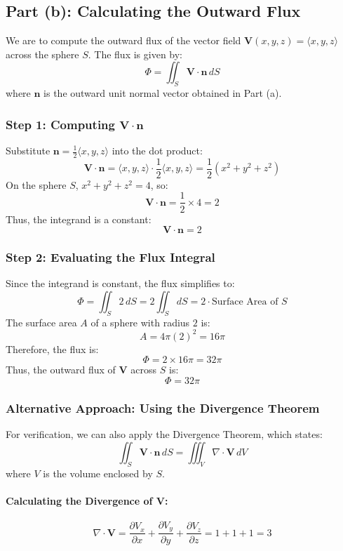 \documentclass[11pt]{article}
\begin{document}
\newpage

\subsection{Part (b): Calculating the Outward Flux}

We are to compute the outward flux of the vector field \( \mathbf{V}(x,y,z) = \langle x, y, z \rangle \) across the sphere \( S \). The flux is given by:
\[
\Phi = \iint_{S} \mathbf{V} \cdot \mathbf{n} \, dS
\]
where \( \mathbf{n} \) is the outward unit normal vector obtained in Part (a).

\subsubsection*{Step 1: Computing \( \mathbf{V} \cdot \mathbf{n} \)}

Substitute \( \mathbf{n} = \frac{1}{2} \langle x, y, z \rangle \) into the dot product:
\[
\mathbf{V} \cdot \mathbf{n} = \langle x, y, z \rangle \cdot \frac{1}{2} \langle x, y, z \rangle = \frac{1}{2}(x^2 + y^2 + z^2)
\]
On the sphere \( S \), \( x^2 + y^2 + z^2 = 4 \), so:
\[
\mathbf{V} \cdot \mathbf{n} = \frac{1}{2} \times 4 = 2
\]
Thus, the integrand is a constant:
\[
\mathbf{V} \cdot \mathbf{n} = 2
\]

\subsubsection*{Step 2: Evaluating the Flux Integral}

Since the integrand is constant, the flux simplifies to:
\[
\Phi = \iint_{S} 2 \, dS = 2 \iint_{S} dS = 2 \cdot \text{Surface Area of } S
\]
The surface area \( A \) of a sphere with radius \( 2 \) is:
\[
A = 4\pi (2)^2 = 16\pi
\]
Therefore, the flux is:
\[
\Phi = 2 \times 16\pi = 32\pi
\]
Thus, the outward flux of \( \mathbf{V} \) across \( S \) is:
\[
\boxed{ \Phi = 32\pi }
\]

\subsubsection*{Alternative Approach: Using the Divergence Theorem}

For verification, we can also apply the Divergence Theorem, which states:
\[
\iint_{S} \mathbf{V} \cdot \mathbf{n} \, dS = \iiint_{V} \nabla \cdot \mathbf{V} \, dV
\]
where \( V \) is the volume enclosed by \( S \).

\paragraph{Calculating the Divergence of \( \mathbf{V} \):}
\[
\nabla \cdot \mathbf{V} = \frac{\partial V_x}{\partial x} + \frac{\partial V_y}{\partial y} + \frac{\partial V_z}{\partial z} = 1 + 1 + 1 = 3
\]
\end{document}
